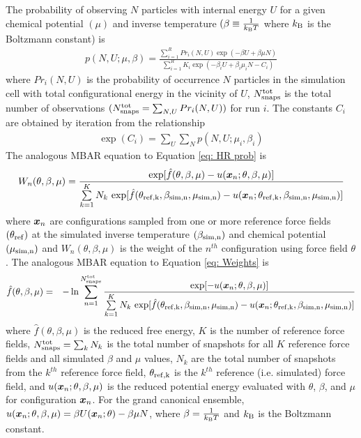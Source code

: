 \documentclass[journal=jced,manuscript=article]{achemso}
\newcommand{\bfv}[1]{{\mbox{\boldmath{$#1$}}}}
\newcommand{\x}{\bfv{x}}
\begin{document}
The probability of observing $N$ particles with internal energy $U$ for a given chemical potential $(\mu)$ and inverse temperature $(\beta \equiv \frac{1}{k_{\rm B}T}$ where $k_{\rm B}$ is the Boltzmann constant) is
\begin{eqnarray} \label{eq: HR prob}
p(N,U;\mu,\beta) = \frac{\sum_{i=1}^{R} Pr_i(N,U)  \exp(-\beta U + \beta \mu N)}{\sum_{i=1}^{R} K_i \exp(-\beta_i U + \beta_i \mu_i N - C_i)}
\end{eqnarray}
where $Pr_i(N,U)$ is the probability of occurrence $N$ particles in the simulation cell with total configurational energy in the vicinity of $U$, $N^{\rm tot}_{\rm snaps}$ is the total number of observations $(N^{\rm tot}_{\rm snaps} = \sum_{N,U} Pr_i(N,U))$ for run $i$. The constants $C_i$ are obtained by iteration from the relationship
\begin{eqnarray} \label{eq: Weights}
\exp (C_i) = \sum_{U} \sum_{N} p(N,U;\mu_i,\beta_i)
\end{eqnarray}
The analogous MBAR equation to Equation \ref{eq: HR prob} is 
\begin{eqnarray} \label{eq: MBAR weights theta}
W_{n}(\theta,\beta,\mu) = \frac{\exp[\hat{f}(\theta,\beta,\mu)-u(\x_{n};\theta,\beta,\mu)]}{\sum\limits_{k=1}^K N_k \, \exp[\hat{f}(\theta_{\rm ref,k},\beta_{\rm sim,n},\mu_{\rm sim,n}) - u(\x_{n};\theta_{\rm ref,k},\beta_{\rm sim,n},\mu_{\rm sim,n})]}
\end{eqnarray}
where $\x_n$ are configurations sampled from one or more reference force fields $(\theta_{\rm ref})$ at the simulated inverse temperature $(\beta_{\rm sim,n})$ and chemical potential $(\mu_{\rm sim,n})$ and $W_{n}(\theta,\beta,\mu)$ is the weight of the $n^{th}$ configuration using force field $\theta$. The analogous MBAR equation to Equation \ref{eq: Weights} is
\begin{eqnarray} \label{eq: MBAR free energy theta}
\hat f(\theta,\beta,\mu) &=& - \ln \sum_{n=1}^{N^{\rm tot}_{\rm snaps}}
\frac{\exp[-u(\x_{n};\theta,\beta,\mu)]}{\sum\limits_{k=1}^K N_k \, \exp[\hat{f}(\theta_{\rm ref,k},\beta_{\rm sim,n},\mu_{\rm sim,n}) - u(\x_{n};\theta_{\rm ref,k},\beta_{\rm sim,n},\mu_{\rm sim,n})]}
\end{eqnarray}
where $\hat f(\theta,\beta,\mu)$ is the reduced free energy, $K$ is the number of reference force fields, $N^{\rm tot}_{\rm snaps} = \sum_k N_k$ is the total number of snapshots for all $K$ reference force fields and all simulated $\beta$ and $\mu$ values, $N_k$ are the total number of snapshots from the $k^{th}$ reference force field, $\theta_{\rm ref,k}$ is the $k^{th}$ reference (i.e. simulated) force field, and $u(\x_{n};\theta,\beta,\mu)$ is the reduced potential energy evaluated with $\theta$, $\beta$, and $\mu$ for configuration $\x_n$. For the grand canonical ensemble, $u(\x_{n};\theta,\beta,\mu) = \beta U(\x_n;\theta) - \beta \mu N$, where $\beta = \frac{1}{k_{\rm B}T}$ and $k_{\rm B}$ is the Boltzmann constant.
\end{document}
